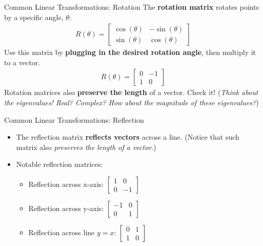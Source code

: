 \begin{frame}{Common Linear Transformations: Rotation}
    The \textbf{rotation matrix} rotates points by a specific angle, $\theta$:
    \begin{align*}
        R(\theta) = \begin{bmatrix} 
                \cos(\theta) & -\sin(\theta) \\
                \sin(\theta) & \cos(\theta)
            \end{bmatrix}
    \end{align*}
    Use this matrix by \textbf{plugging in the desired rotation angle}, then multiply it to a vector.
    \begin{align*}
        R(\theta) = \begin{bmatrix} 
            0 & -1 \\
            1 & 0
        \end{bmatrix}
    \end{align*}
    Rotation matrices also \textbf{preserve the length} of a vector. Check it! (\textit{Think about the eigenvalues! Real? Complex? How about the magnitude of these eigenvalues?})
\end{frame}

\begin{frame}{Common Linear Transformations: Reflection}
    \begin{itemize}
        \item The reflection matrix \textbf{reflects vectors} across a line. (Notice that such matrix also \textit{preserves the length of a vector}.)
        \item Notable reflection matrices:
        \begin{itemize}
            \item Reflection across x-axis: $\begin{bmatrix} 1 & 0 \\ 0 & -1 \end{bmatrix}$ \\[1.1ex]
            \item Reflection across y-axis: $\begin{bmatrix} -1 & 0 \\ 0 & 1 \end{bmatrix}$ \\[1.1ex]
            \item Reflection across line $y = x$: $\begin{bmatrix} 0 & 1 \\ 1 & 0 \end{bmatrix}$
        \end{itemize}
    \end{itemize}
\end{frame}

